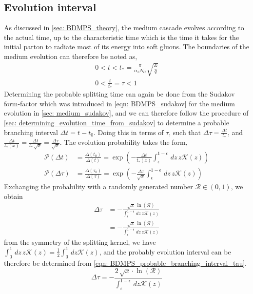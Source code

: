 \documentclass[main.tex]{subfiles}
\begin{document}
\subsection{Evolution interval}
As discussed in \autoref{sec: BDMPS_theory}, the medium cascade evolves according to the actual time, up to the characteristic time which is the time it takes for the initial parton to radiate most of its energy into soft gluons. The boundaries of the medium evolution can therefore be noted as, 
\begin{align}\label{eqn: medium_evolution_boundaries}
    0 < t < t_* = \frac{\pi}{\alpha_S N_C} \sqrt{\frac{E}{\hat q}} \nonumber \\
    0 < \frac{t}{t_*} = \tau < 1
\end{align}
Determining the probable splitting time can again be done from the Sudakov form-factor which was introduced in \autoref{eqn: BDMPS_sudakov} for the medium evolution in \autoref{sec: medium_sudakov}, and we can therefore follow the procedure of \autoref{sec: determining_evolution_time_from_sudakov} to determine a probable branching interval \(\Delta t = t-t_0\). Doing this in terms of \(\tau\), such that \(\Delta \tau = \frac{\Delta t}{t_*}\), and  \(\frac{\Delta t}{t_*(x)} = \frac{\Delta t}{t_* \, \sqrt{x}} = \frac{\Delta \tau}{\sqrt{x}}\). The evolution probability takes the form,
\begin{align}
    \mathcal{P}(\Delta t) &= \frac{\Delta(t_0)}{\Delta(t)} = \exp \left(- \frac{\Delta t}{t_*(x)} \int_\epsilon^{1-\epsilon} \, dz\, z \mathcal{K}(z) \right) \nonumber \\
    \mathcal{P}(\Delta \tau) &= \frac{\Delta(\tau_0)}{\Delta(\tau)} = \exp \left(- \frac{\Delta \tau}{\sqrt{x}} \int_\epsilon^{1-\epsilon} \, dz\, z \mathcal{K}(z) \right)
\end{align}
Exchanging the probability with a randomly generated number \(\mathcal{R}\in (0,1)\), we obtain
\begin{align}
    \Delta \tau &= -\frac{\sqrt{x}\,\ln(\mathcal{R}) }{\int_\epsilon^{1-\epsilon} \, dz\, z \mathcal{K}(z)} \nonumber \\
    &= -\frac{\sqrt{x}\,\ln(\mathcal{R}) }{\int_\epsilon^{1-\epsilon} \, dz\, z \mathcal{K}(z)} 
\end{align}
from the symmetry of the splitting kernel, we have \(\int_0^1 \, dz\, z \mathcal{K}(z) = \frac{1}{2} \int_0^1 \, dz \mathcal{K}(z)\), and the probably evolution interval can be therefore be determined from \autoref{eqn: BDMPS_probable_branching_interval_tau}.
\begin{equation}\label{eqn: BDMPS_probable_branching_interval_tau}
    \Delta \tau = -\frac{2\, \sqrt{x}\cdot \ln(\mathcal{R}) }{\int_\epsilon^{1-\epsilon} \, dz \mathcal{K}(z)} 
\end{equation}
\end{document}
